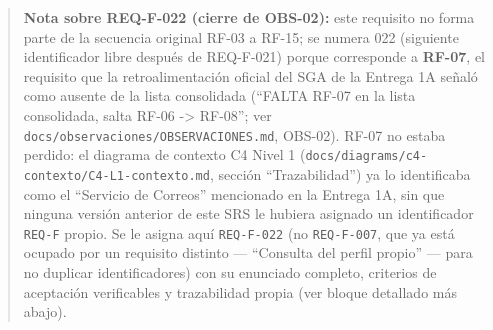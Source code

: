 \documentclass[
]{article}
\begin{document}
\begin{quote}
\textbf{Nota sobre REQ-F-022 (cierre de OBS-02):} este requisito no
forma parte de la secuencia original RF-03 a RF-15; se numera 022
(siguiente identificador libre después de REQ-F-021) porque corresponde
a \textbf{RF-07}, el requisito que la retroalimentación oficial del SGA
de la Entrega 1A señaló como ausente de la lista consolidada (``FALTA
RF-07 en la lista consolidada, salta RF-06 -\textgreater{} RF-08''; ver
\texttt{docs/observaciones/OBSERVACIONES.md}, OBS-02). RF-07 no estaba
perdido: el diagrama de contexto C4 Nivel 1
(\texttt{docs/diagrams/c4-contexto/C4-L1-contexto.md}, sección
``Trazabilidad'') ya lo identificaba como el ``Servicio de Correos''
mencionado en la Entrega 1A, sin que ninguna versión anterior de este
SRS le hubiera asignado un identificador \texttt{REQ-F} propio. Se le
asigna aquí \texttt{REQ-F-022} (no \texttt{REQ-F-007}, que ya está
ocupado por un requisito distinto --- ``Consulta del perfil propio'' ---
para no duplicar identificadores) con su enunciado completo, criterios
de aceptación verificables y trazabilidad propia (ver bloque detallado
más abajo).
\end{quote}
\end{document}

